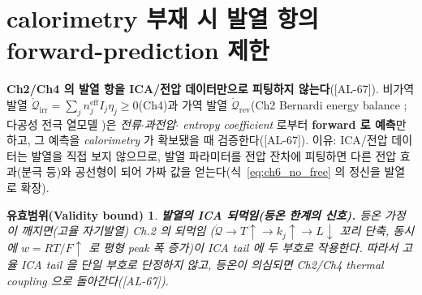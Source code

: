\documentclass[11pt,a4paper]{article}
\newtheorem*{boundbox}{유효범위(Validity bound)}
\newcommand{\eff}{\mathrm{eff}}
\newcommand{\irr}{\mathrm{irr}}
\newcommand{\rev}{\mathrm{rev}}
\newcommand{\AL}[1]{\textsf{[AL-#1]}}
\begin{document}
\section{calorimetry 부재 시 발열 항의 forward-prediction 제한}\label{sec:ch6_heat}
\textbf{Ch2/Ch4 의 발열 항을 ICA/전압 데이터만으로 피팅하지 않는다}(\AL{67}). 비가역 발열
$\dot{\mathcal Q}_\irr=\sum_j n_j^{\eff}I_j\eta_j\ge0$(Ch4)과 가역 발열 $\dot{\mathcal Q}_\rev$(Ch2 Bernardi
energy balance \cite{bernardi1985}; 다공성 전극 열모델 \cite{thomasnewman2003})은 \emph{전류$\cdot$과전압$\cdot$
entropy coefficient} 로부터 \textbf{forward 로 예측}만 하고, 그 예측을 \emph{calorimetry} 가 확보됐을 때
검증한다(\AL{67}). 이유: ICA/전압 데이터는 발열을 직접 보지 않으므로, 발열 파라미터를
전압 잔차에 피팅하면 다른 전압 효과(분극 등)와 공선형이 되어 가짜 값을 얻는다(식~\eqref{eq:ch6_no_free} 의
정신을 발열로 확장).
\begin{boundbox}
\textbf{발열의 ICA 되먹임(등온 한계의 신호).} 등온 가정이 깨지면(고율 자기발열) Ch.2 의 되먹임
($\dot{\mathcal Q}\to T\uparrow\to k_j\uparrow\to L\downarrow$ 꼬리 단축, 동시에 $w=RT/F\uparrow$ 로 평형 peak
폭 증가)이 ICA tail 에 두 부호로 작용한다. 따라서 고율 ICA tail 을 단일 부호로 단정하지 않고, 등온이 의심되면
Ch2/Ch4 thermal coupling 으로 돌아간다(\AL{67}).
\end{boundbox}

\end{document}

